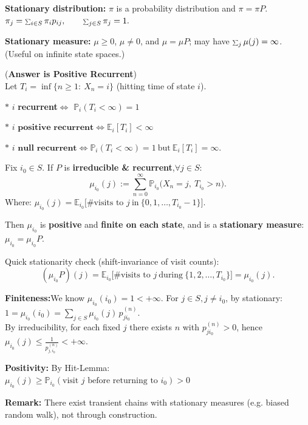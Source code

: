 \documentclass[a4paper, landscape]{article}
\newcommand{\subtopic}[1]{\par\textbf{#1}}
\newcommand{\smallsum}{\mathop{\scalebox{0.65}{$\sum$}}\nolimits}
\renewcommand{\subtopic}[1]{\par\textbf{\color{blue}{#1}}} %
\begin{document}
\begin{multicols}{4}
\subtopic{Recall: Stationary distribution vs stationary measure}
\textbf{Stationary distribution:} $\pi$ is a probability distribution and $\pi=\pi P$. $\pi_j=\smallsum_{i\in S}\pi_i p_{ij},\qquad \smallsum_{j\in S}\pi_j=1.$

\textbf{Stationary measure:} $\mu\ge 0$, $\mu\neq 0$, and $\mu=\mu P$; may have $\smallsum_j\mu(j)=\infty$.
(Useful on infinite state spaces.)


\subtopic{When does a stationary measure becomes a stationary distribution?} (\textbf{Answer is Positive Recurrent})\\
Let $T_i=\inf\{n\ge 1:\ X_n=i\}$ (hitting time of state $i$).
\par $*$ $i$ \textbf{recurrent}$\iff$ $\mathbb P_i(T_i<\infty)=1$
\par $*$ $i$ $\textbf{positive recurrent}\iff \mathbb E_i[T_i]<\infty$
\par $*$ $i$ $\textbf{null recurrent}\iff \mathbb P_i(T_i<\infty)=1\ \text{but}\ \mathbb E_i[T_i]=\infty.$


\subtopic{Recurrence is sufficient for $\exists$ a stationary measure:}
\subtopic{Step1: Construction of stationary measure under recurrence}
\subtopic{Theorem:} Fix $i_0\in S$. If $P$ is \textbf{irreducible \& recurrent},$\forall j\in S$:
\[
\mu_{i_0}(j):=\sum_{n=0}^\infty \mathbb P_{i_0}\big(X_n=j,\ T_{i_0}>n\big).
\]
Where: $\mu_{i_0}(j)=\mathbb E_{i_0}\big[\#\text{visits to }j\ \text{in}\ \{0,1,\dots,T_{i_0}-1\}\big].$

Then $\mu_{i_0}$ is \textbf{positive} and \textbf{finite on each state}, and is a \textbf{stationary measure}: $\mu_{i_0}=\mu_{i_0}P.$

Quick stationarity check (shift-invariance of visit counts):
\[
(\mu_{i_0}P)(j)=\mathbb E_{i_0}\big[\#\text{visits to }j\ \text{during}\ \{1,2,\dots,T_{i_0}\}\big]
=\mu_{i_0}(j).
\]

\textbf{Finiteness:}We know $\mu_{i_0}(i_0)=1<+\infty$. For $j \in S, j\neq i_0$, by stationary: $1=\mu_{i_0}(i_0)=\sum_{j\in S}\mu_{i_0}(j)\,p^{(n)}_{j i_0}.$\\
By irreducibility, for each fixed $j$ there exists $n$ with $p^{(n)}_{j i_0}>0$, hence $\mu_{i_0}(j)\le \frac{1}{p^{(n)}_{j,i_0}}<+\infty.$
 
\textbf{Positivity:} By Hit-Lemma:\\
$\mu_{i_0}(j) \geq \mathbb P_{i_0}(\text{visit }j \text{ before returning to }i_0)>0$

\textbf{Remark:} There exist transient chains with stationary measures
(e.g. biased random walk), not through construction.



\end{multicols}
\end{document}
